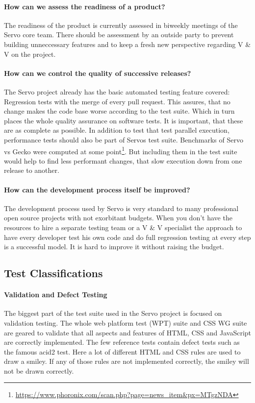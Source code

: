\documentclass{scrartcl}
\begin{document}
\paragraph{How can we assess the readiness of a product?} 
The readiness of the product is currently assessed in biweekly meetings of the Servo core team. There should be assessment by an outside party to prevent building unneccessary features and to keep a fresh new perspective regarding V \& V on the project.

\paragraph{How can we control the quality of successive releases?}
The Servo project already has the basic automated testing feature covered: Regression tests with the merge of every pull request. This assures, that no change makes the code base worse according to the test suite. Which in turn places the whole quality assurance on software tests. It is important, that these are as complete as possible. In addition to test that test parallel execution, performance tests should also be part of Servos test suite. Benchmarks of Servo vs Gecko were computed at some point\footnote{\url{https://www.phoronix.com/scan.php?page=news_item&px=MTgzNDA}}. But including them in the test suite would help to find less performant changes, that slow execution down from one release to another.

\paragraph{How can the development process itself be improved?}
The development process used by Servo is very standard to many professional open source projects with not exorbitant budgets. When you don't have the resources to hire a separate testing team or a V \& V specialist the approach to have every developer test his own code and do full regression testing at every step is a successful model. It is hard to improve it without raising the budget. 


\subsection{Test Classifications}

\paragraph{Validation and Defect Testing}
The biggest part of the test suite used in the Servo project is focused on validation testing. The whole web platform test (WPT) suite and CSS WG suite are geared to validate that all aspects and features of HTML, CSS and JavaScript are correctly implemented. The few reference tests contain defect tests such as the famous acid2 test. Here a lot of different HTML and CSS rules are used to draw a smiley. If any of those rules are not implemented correctly, the smiley will not be drawn correctly.
\end{document}
